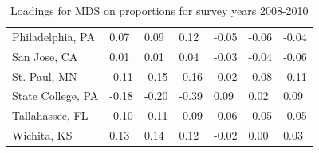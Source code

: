 \documentclass[11pt]{asaproc}
\begin{document}
\begin{table}[H]
\begin{center}
{\begin{tabular}{P{3.75cm}{r}{r}{r}{r}{r}{r}}
Philadelphia, PA & 0.07 & 0.09 & 0.12 & -0.05 & -0.06 & -0.04 \\
San Jose, CA & 0.01 & 0.01 & 0.04 & -0.03 & -0.04 &  -0.06 \\
St. Paul, MN & -0.11 & -0.15 & -0.16 & -0.02 & -0.08 & -0.11 \\
State College, PA & -0.18 & -0.20 & -0.39 & 0.09 & 0.02 & 0.09 \\
Tallahassee, FL &  -0.10 & -0.11 & -0.09 & -0.06 & -0.05 & -0.05 \\
Wichita, KS & 0.13 & 0.14 & 0.12 & -0.02 & 0.00 & 0.03 \\
\hline
\end{tabular}}
\caption{Loadings for MDS on proportions for survey years 2008-2010}
\label{table:MDSproportions}
\end{center}
\end{table}
\end{document}
